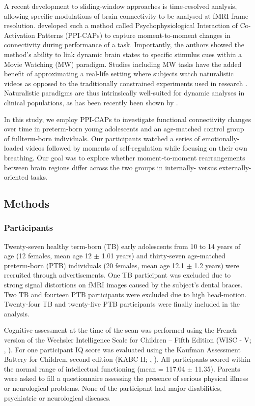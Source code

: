 A recent development to sliding-window approaches is time-resolved analysis, allowing specific modulations of brain connectivity to be analysed at fMRI frame resolution. \citet{Freitas2020} developed such a method called Psychophysiological Interaction of Co-Activation Patterns (PPI-CAPs) to capture moment-to-moment changes in connectivity during performance of a task. Importantly, the authors showed the method's ability to link dynamic brain states to specific stimulus cues within a Movie Watching (MW) paradigm. Studies including MW tasks have the added benefit of approximating a real-life setting where subjects watch naturalistic videos as opposed to the traditionally constrained experiments used in research \citep{Vanderwal2019}. Naturalistic paradigms are thus intrinsically well-suited for dynamic analyses in clinical populations, as has been recently been shown by \citet{Bolton2020a}.


In this study, we employ PPI-CAPs to investigate functional connectivity changes over time in preterm-born young adolescents and an age-matched control group of fullterm-born individuals. Our participants watched a series of emotionally-loaded videos followed by moments of self-regulation while focusing on their own breathing. Our goal was to explore whether moment-to-moment rearrangements between brain regions differ across the two groups in internally- versus externally-oriented tasks.

\subsection{Methods}

\subsubsection{Participants} \label{subsection:OFC_participants}
Twenty-seven healthy term-born (TB) early adolescents from 10 to 14 years of age (12 females, mean age 12 $\pm$ 1.01 years) and thirty-seven age-matched preterm-born (PTB) individuals (20 females, mean age 12.1 $\pm$ 1.2 years) were recruited through advertisements. One TB participant was excluded due to strong signal distortions on fMRI images caused by the subject’s dental braces. Two TB and fourteen PTB participants were excluded due to high head-motion. Twenty-four TB and twenty-five PTB participants were finally included in the analysis.

Cognitive assessment at the time of the scan was performed using the French version of the Wechsler Intelligence Scale for Children – Fifth Edition (WISC - V; \citeauthor{Wechsler2014}, \citeyear{Wechsler2014}). For one participant IQ score was evaluated using the Kaufman Assessment Battery for Children, second edition (KABC-II; \citeauthor{Kaufman2004}, \citeyear{Kaufman2004}). All participants scored within the normal range of intellectual functioning (mean = 117.04 $\pm$ 11.35). Parents were asked to fill a questionnaire assessing the presence of serious physical illness or neurological problems. None of the participant had major disabilities, psychiatric or neurological diseases.

